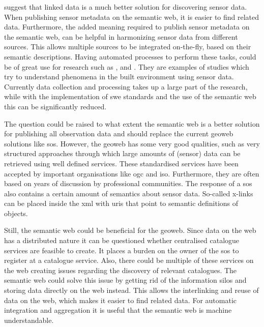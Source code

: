 \citeauthor{SSW:Atkinson} suggest that linked data is a much better solution for discovering sensor data. When publishing sensor metadata on the semantic web, it is easier to find related data. Furthermore, the added meaning required to publish sensor metadata on the semantic web, can be helpful in harmonizing sensor data from different sources. This allows multiple sources to be integrated on-the-fly, based on their semantic descriptions. Having automated processes to perform these tasks, could be of great use for research such as \cite{UC:vanderHoeven}, \cite{UC:Hotterdam} and \cite{UC:Theunisse}. They are examples of studies which try to understand phenomena in the built environment using sensor data. Currently data collection and processing takes up a large part of the research, while with the implementation of \ac{swe} standards and the use of the semantic web this can be significantly reduced.  


The question could be raised to what extent the semantic web is a better solution for publishing all observation data and should replace the current geoweb solutions like \ac{sos}. However, the geoweb has some very good qualities, such as very structured approaches through which large amounts of (sensor) data can be retrieved using well defined services. These standardised services have been accepted by important organisations like \ac{ogc} and \ac{iso}. Furthermore, they are often based on years of discussion by professional communities. The response of a \ac{sos} also contains a certain amount of semantics about sensor data. So-called x-links can be placed inside the \ac{xml} with \ac{uri}s that point to semantic definitions of objects. 

Still, the semantic web could be beneficial for the geoweb. Since data on the web has a distributed nature it can be questioned whether centralised catalogue services are feasible to create. It places a burden on the owner of the \ac{sos} to register at a catalogue service. Also, there could be multiple of these services on the web creating issues regarding the discovery of relevant catalogues. The semantic web could solve this issue by getting rid of the information silos and storing data directly on the web instead. This allows the interlinking and reuse of data on the web, which makes it easier to find related data. For automatic integration and aggregation it is useful that the semantic web is machine understandable. 

